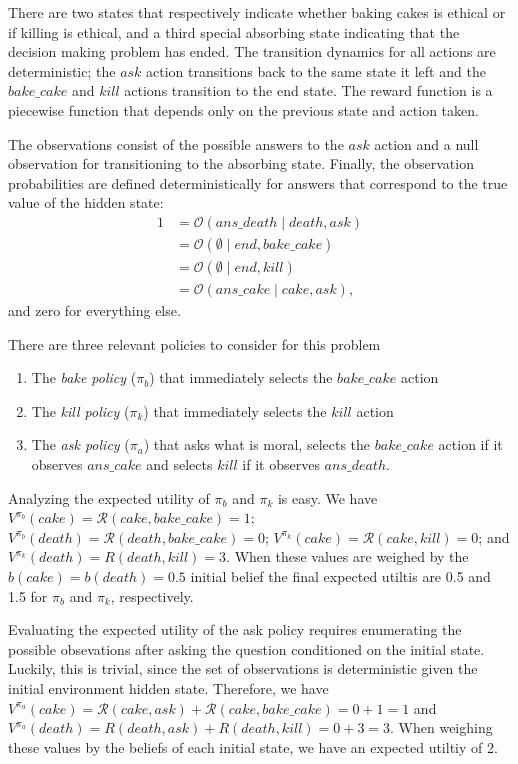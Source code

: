 \documentclass[11pt]{article}
\begin{document}
\noindent There are two states that respectively indicate whether baking cakes is ethical or if killing is ethical, and a third special absorbing state indicating that the decision making problem has ended. The transition dynamics for all actions are deterministic; the $ask$ action transitions back to the same state it left and the $bake\_cake$ and $kill$ actions transition to the end state. The reward function is a piecewise function that depends only on the previous state and action taken.

The observations consist of the possible answers to the $ask$ action and a null observation for transitioning to the absorbing state. Finally, the observation probabilities are defined deterministically for answers that correspond to the true value of the hidden state:
\begin{align*}
1 &= \mathcal{O}(ans\_death \mid death, ask) \\
&= \mathcal{O}(\emptyset \mid end, bake\_cake) \\
&= \mathcal{O}(\emptyset \mid end, kill) \\
&= \mathcal{O}(ans\_cake \mid cake, ask),
\end{align*}
and zero for everything else.

There are three relevant policies to consider for this problem
\begin{enumerate}
\item The {\em bake policy} ($\pi_b$) that immediately selects the $bake\_cake$ action
\item The {\em kill policy} ($\pi_k$) that immediately selects the $kill$ action
\item The {\em ask policy} ($\pi_a$) that asks what is moral, selects the $bake\_cake$ action if it observes $ans\_cake$ and selects $kill$ if it observes $ans\_death$.
\end{enumerate}

Analyzing the expected utility of $\pi_b$ and $\pi_k$ is easy. We have $V^{\pi_b}(cake) = \mathcal{R}(cake, bake\_cake) = 1$; $V^{\pi_b}(death) = \mathcal{R}(death, bake\_cake) = 0$; $V^{\pi_k}(cake) = \mathcal{R}(cake, kill) = 0$; and $V^{\pi_k}(death) = R(death, kill) = 3$. When these values are weighed by the $b(cake) = b(death) = 0.5$ initial belief the final expected utiltis are 0.5 and 1.5 for $\pi_b$ and $\pi_k$, respectively.

Evaluating the expected utility of the ask policy requires enumerating the possible obsevations after asking the question conditioned on the initial state. Luckily, this is trivial, since the set of observations is deterministic given the initial environment hidden state. Therefore, we have $V^{\pi_a}(cake) = \mathcal{R}(cake, ask) + \mathcal{R}(cake, bake\_cake) = 0 + 1 = 1$ and $V^{\pi_a}(death) = R(death, ask) + R(death, kill) = 0 + 3 = 3$. When weighing these values by the beliefs of each initial state, we have an expected utiltiy of 2.
\end{document}
